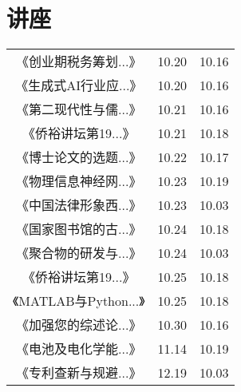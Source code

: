 \section{讲座}
\begin{tabular}{|c|c|c|}
    \hline《创业期税务筹划...》 & 10.20 & 10.16 \\
《生成式AI行业应...》 & 10.20 & 10.16 \\
《第二现代性与儒...》 & 10.21 & 10.16 \\
《侨裕讲坛第19...》 & 10.21 & 10.18 \\
《博士论文的选题...》 & 10.22 & 10.17 \\
《物理信息神经网...》 & 10.23 & 10.19 \\
《中国法律形象西...》 & 10.23 & 10.03 \\
《国家图书馆的古...》 & 10.24 & 10.18 \\
《聚合物的研发与...》 & 10.24 & 10.03 \\
《侨裕讲坛第19...》 & 10.25 & 10.18 \\
《MATLAB与Python...》 & 10.25 & 10.18 \\
《加强您的综述论...》 & 10.30 & 10.16 \\
《电池及电化学能...》 & 11.14 & 10.19 \\
《专利查新与规避...》 & 12.19 & 10.03 \\
    \hline\hline
    \hline
\end{tabular}